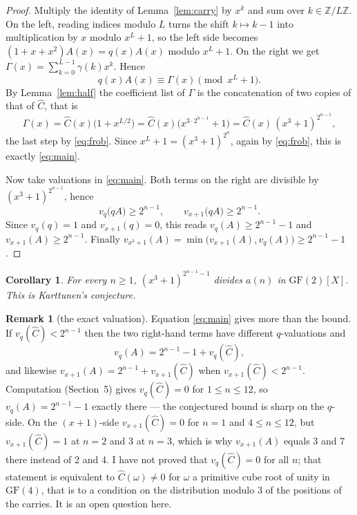 \documentclass[11pt,a4paper]{article}
\theoremstyle{plain}
\newtheorem{corollary}[theorem]{Corollary}
\theoremstyle{definition}
\newtheorem{remark}[theorem]{Remark}
\newcommand{\Chat}{\widehat{C}}
\begin{document}
\begin{proof}
Multiply the identity of Lemma~\ref{lem:carry} by $x^{k}$ and sum over
$k\in\mathbb{Z}/L\mathbb{Z}$. On the left, reading indices modulo $L$ turns the shift
$k\mapsto k-1$ into multiplication by $x$ modulo $x^{L}+1$, so the left side becomes
$(1+x+x^{2})A(x)=q(x)A(x)$ modulo $x^{L}+1$. On the right we get
$\Gamma(x)=\sum_{k=0}^{L-1}\gamma(k)x^{k}$. Hence
\[
  q(x)A(x)\equiv\Gamma(x)\pmod{x^{L}+1}.
\]
By Lemma~\ref{lem:half} the coefficient list of $\Gamma$ is the concatenation of two copies
of that of $\Chat$, that is
\[
  \Gamma(x)=\Chat(x)\bigl(1+x^{L/2}\bigr)=\Chat(x)\bigl(x^{3\cdot2^{n-1}}+1\bigr)
  =\Chat(x)\,(x^{3}+1)^{2^{n-1}},
\]
the last step by \eqref{eq:frob}. Since $x^{L}+1=(x^{3}+1)^{2^{n}}$, again by
\eqref{eq:frob}, this is exactly \eqref{eq:main}.

Now take valuations in \eqref{eq:main}. Both terms on the right are divisible by
$(x^{3}+1)^{2^{n-1}}$, hence
\[
  v_{q}\bigl(qA\bigr)\ge2^{n-1},\qquad v_{x+1}\bigl(qA\bigr)\ge2^{n-1}.
\]
Since $v_{q}(q)=1$ and $v_{x+1}(q)=0$, this reads $v_{q}(A)\ge2^{n-1}-1$ and
$v_{x+1}(A)\ge2^{n-1}$. Finally
$v_{x^{3}+1}(A)=\min\bigl(v_{x+1}(A),v_{q}(A)\bigr)\ge2^{n-1}-1$.
\end{proof}

\begin{corollary}
For every $n\ge1$, $(x^{3}+1)^{2^{n-1}-1}$ divides $a(n)$ in $\mathrm{GF}(2)[X]$. This is
Karttunen's conjecture.
\end{corollary}

\begin{remark}[the exact valuation]
Equation \eqref{eq:main} gives more than the bound. If $v_{q}(\Chat)<2^{n-1}$ then the two
right-hand terms have different $q$-valuations and
\[
  v_{q}(A)=2^{n-1}-1+v_{q}(\Chat),
\]
and likewise $v_{x+1}(A)=2^{n-1}+v_{x+1}(\Chat)$ when $v_{x+1}(\Chat)<2^{n-1}$.
Computation (Section~5) gives $v_{q}(\Chat)=0$ for $1\le n\le12$, so $v_{q}(A)=2^{n-1}-1$
exactly there --- the conjectured bound is sharp on the $q$-side. On the $(x+1)$-side
$v_{x+1}(\Chat)=0$ for $n=1$ and $4\le n\le12$, but $v_{x+1}(\Chat)=1$ at $n=2$ and 3 at
$n=3$, which is why $v_{x+1}(A)$ equals 3 and 7 there instead of 2 and 4. I have not proved
that $v_{q}(\Chat)=0$ for all $n$; that statement is equivalent to $\Chat(\omega)\ne0$ for
$\omega$ a primitive cube root of unity in $\mathrm{GF}(4)$, that is to a condition on the
distribution modulo 3 of the positions of the carries. It is an open question here.
\end{remark}
\end{document}
